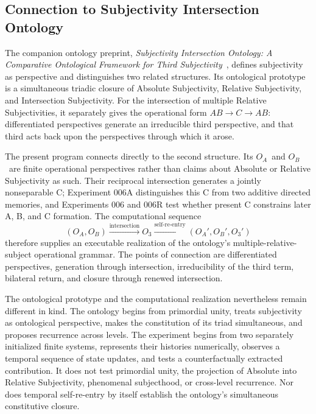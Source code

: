 \documentclass[11pt,a4paper]{article}
\newcommand{\OA}{\ensuremath{O_{A}}}
\newcommand{\OB}{\ensuremath{O_{B}}}
\newcommand{\Othree}{\ensuremath{O_{3}}}
\begin{document}
\subsection{Connection to Subjectivity Intersection Ontology}

The companion ontology preprint, \emph{Subjectivity Intersection Ontology: A Comparative Ontological Framework for Third Subjectivity}~\cite{watanabe2026sio}, defines subjectivity as perspective and distinguishes two related structures. Its ontological prototype is a simultaneous triadic closure of Absolute Subjectivity, Relative Subjectivity, and Intersection Subjectivity. For the intersection of multiple Relative Subjectivities, it separately gives the operational form $AB\rightarrow C\rightarrow AB$: differentiated perspectives generate an irreducible third perspective, and that third acts back upon the perspectives through which it arose.

The present program connects directly to the second structure. Its \OA\ and \OB\ are finite operational perspectives rather than claims about Absolute or Relative Subjectivity as such. Their reciprocal intersection generates a jointly nonseparable C; Experiment 006A distinguishes this C from two additive directed memories, and Experiments 006 and 006R test whether present C constrains later A, B, and C formation. The computational sequence
\[
 (\OA,\OB)\xrightarrow{\text{intersection}}\Othree
 \xrightarrow{\text{self-re-entry}}(\OA',\OB',\Othree')
\]
therefore supplies an executable realization of the ontology's multiple-relative-subject operational grammar. The points of connection are differentiated perspectives, generation through intersection, irreducibility of the third term, bilateral return, and closure through renewed intersection.

The ontological prototype and the computational realization nevertheless remain different in kind. The ontology begins from primordial unity, treats subjectivity as ontological perspective, makes the constitution of its triad simultaneous, and proposes recurrence across levels. The experiment begins from two separately initialized finite systems, represents their histories numerically, observes a temporal sequence of state updates, and tests a counterfactually extracted contribution. It does not test primordial unity, the projection of Absolute into Relative Subjectivity, phenomenal subjecthood, or cross-level recurrence. Nor does temporal self-re-entry by itself establish the ontology's simultaneous constitutive closure.
\end{document}
